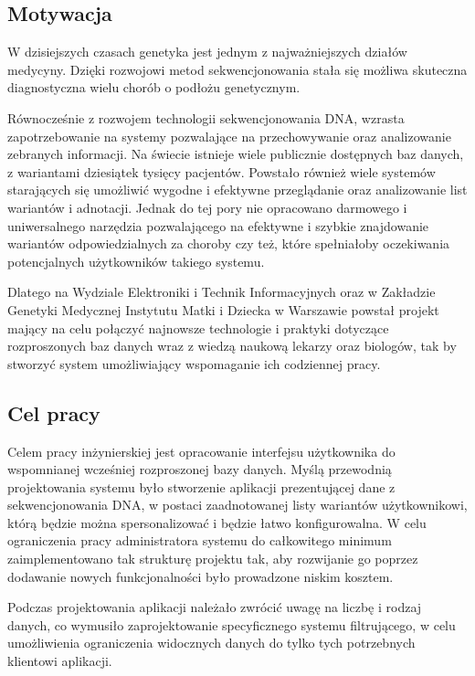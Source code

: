 \documentclass[a4paper,12pt,twoside]{article}
\begin{document}
\subsection{Motywacja}

W dzisiejszych czasach genetyka jest jednym z najważniejszych działów medycyny.
Dzięki rozwojowi metod sekwencjonowania stała się możliwa skuteczna diagnostyczna wielu chorób o podłożu genetycznym.

Równocześnie z rozwojem technologii sekwencjonowania DNA, wzrasta zapotrzebowanie
na systemy pozwalające na przechowywanie oraz analizowanie zebranych
informacji.
Na świecie istnieje wiele publicznie dostępnych baz danych,
z wariantami dziesiątek tysięcy pacjentów. Powstało również
wiele systemów starających się umożliwić wygodne i efektywne
przeglądanie oraz analizowanie list wariantów i adnotacji.
Jednak do tej pory nie opracowano darmowego i uniwersalnego narzędzia pozwalającego
na efektywne i szybkie znajdowanie
wariantów odpowiedzialnych za choroby czy też, które spełniałoby oczekiwania potencjalnych użytkowników takiego systemu.

Dlatego na Wydziale Elektroniki i Technik Informacyjnych
oraz w Zakładzie Genetyki Medycznej Instytutu Matki i Dziecka w Warszawie
powstał projekt mający na celu połączyć najnowsze technologie i
praktyki dotyczące rozproszonych baz danych wraz z wiedzą naukową
lekarzy oraz biologów, tak by stworzyć system umożliwiający
wspomaganie ich codziennej pracy.

\subsection{Cel pracy}

Celem pracy inżynierskiej jest opracowanie
interfejsu użytkownika do wspomnianej wcześniej
rozproszonej bazy danych.
Myślą przewodnią projektowania systemu było stworzenie aplikacji
prezentującej dane z sekwencjonowania DNA,
w postaci zaadnotowanej listy wariantów użytkownikowi, którą będzie
można spersonalizować i będzie łatwo konfigurowalna.
W celu ograniczenia pracy administratora systemu do
całkowitego minimum zaimplementowano tak strukturę projektu
tak, aby rozwijanie go poprzez dodawanie nowych funkcjonalności było
prowadzone niskim kosztem.

Podczas projektowania aplikacji należało zwrócić uwagę na
liczbę i rodzaj danych, co wymusiło zaprojektowanie specyficznego systemu
filtrującego, w celu umożliwienia ograniczenia widocznych danych
do tylko tych potrzebnych klientowi aplikacji.
\end{document}
